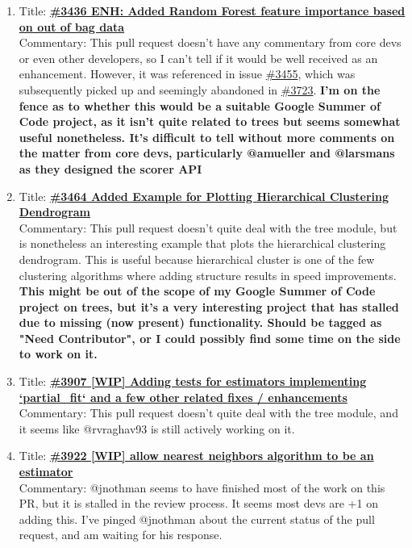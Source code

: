 \documentclass[12pt, oneside]{article}
\begin{document}
\begin{enumerate}
  \item 
  Title:
  \textbf{\href{https://github.com/scikit-learn/scikit-learn/pull/3436}
    {\#3436 ENH: Added Random Forest feature importance based on out
      of bag data}}\\
  Commentary: This pull request doesn't have any commentary from core
  devs or even other developers, so I can't tell if it would be well
  received as an enhancement. However, it was referenced in issue
  \href{https://github.com/scikit-learn/scikit-learn/issues/3455}{\#3455},
  which was subsequently picked up and seemingly abandoned in
  \href{https://github.com/scikit-learn/scikit-learn/pull/3723}{\#3723}. \textbf{I'm
  on the fence as to whether this would be a suitable Google Summer of Code project, as
  it isn't quite related to trees but seems somewhat useful
  nonetheless. It's difficult to tell without more comments on the
  matter from core devs, particularly @amueller and @larsmans as they
  designed the scorer API}

  \item 
  Title:
  \textbf{\href{https://github.com/scikit-learn/scikit-learn/pull/3464}
    {\#3464 Added Example for Plotting Hierarchical Clustering Dendrogram}}\\
  Commentary: This pull request doesn't quite deal with the tree
  module, but is nonetheless an interesting example that plots the
  hierarchical clustering dendrogram. This is useful because
  hierarchical cluster is one of the few clustering algorithms where
  adding structure results in speed improvements. \textbf{This might
    be out of the scope of my Google Summer of Code project on trees, but it's a very
    interesting project that has stalled due to missing (now present)
    functionality. Should be tagged as "Need Contributor", or I could
    possibly find some time on the side to work on it.}


  \item 
  Title:
  \textbf{\href{https://github.com/scikit-learn/scikit-learn/pull/3907}
    {\#3907 [WIP] Adding tests for estimators implementing
      `partial\_fit` and a few other related fixes / enhancements}}\\
  Commentary: This pull request doesn't quite deal with the tree
  module, and it seems like @rvraghav93 is still actively working on
  it.


  \item 
  Title:
  \textbf{\href{https://github.com/scikit-learn/scikit-learn/pull/3922}
    {\#3922 [WIP] allow nearest neighbors algorithm to be an estimator}}\\
  Commentary: @jnothman seems to have finished most of the work on
  this PR, but it is stalled in the review process. It seems most devs
  are +1 on adding this. I've pinged @jnothman about the current
  status of the pull request, and am waiting for his response.


\end{enumerate}
\end{document}

